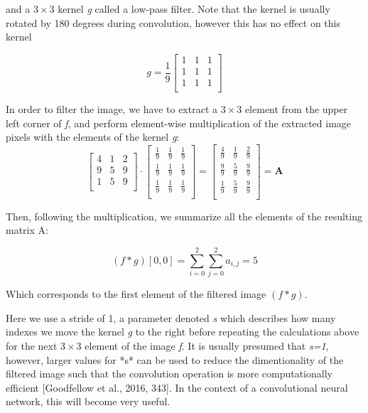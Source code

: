 \documentclass[onecolumn,10pt,cleanfoot]{asme2ej}
\begin{document}
and a $3 \times 3$ kernel \textit{g} called a low-pass filter. Note that the kernel is usually rotated by 180 degrees during convolution, however this has no effect on this kernel

\begin{equation}
g = \frac{1}{9} \begin{bmatrix}
1 & 1 & 1 \\
1 & 1 & 1 \\
1 & 1 & 1 \\
\end{bmatrix}
\end{equation}

In order to filter the image, we have to extract a $3 \times 3$ element from the upper left corner of \textit{f}, and perform element-wise multiplication of the extracted image pixels with the elements of the kernel \textit{g}:
\begin{equation}
\begin{bmatrix}
4 & 1 & 2 \\
9 & 5 & 9 \\
1 & 5 & 9 \\
\end{bmatrix}
\cdot
\begin{bmatrix}
\frac{1}{9} & \frac{1}{9} & \frac{1}{9} \\
\frac{1}{9} & \frac{1}{9} & \frac{1}{9} \\
\frac{1}{9} & \frac{1}{9} & \frac{1}{9} \\
\end{bmatrix}
=
\begin{bmatrix}
\frac{4}{9} & \frac{1}{9} & \frac{2}{9} \\
\frac{9}{9} & \frac{5}{9} & \frac{9}{9} \\
\frac{1}{9} & \frac{5}{9} & \frac{9}{9} \\
\end {bmatrix}
= \textbf{A}
\end{equation}

Then, following the multiplication, we summarize all the elements of the resulting matrix A:

\begin{equation}
(f \ast g)[0, 0] = \sum_{i=0}^{2} \sum_{j=0}^{2} a_{i,j} = 5
\end{equation}

Which corresponds to the first element of the filtered image $(f \ast g)$.

	Here we use a stride of 1, a parameter denoted \textit{s} which describes how many indexes we move the kernel \textit{g} to the right before repeating the calculations above for the next $3 \times 3$ element of the image \textit{f}. It is usually presumed that \textit{s=1}, however, larger values for *s* can be used to reduce the dimentionality of the filtered image such that the convolution operation is more computationally efficient [Goodfellow et al., 2016, 343]. In the context of a convolutional neural network, this will become very useful.
\end{document}
